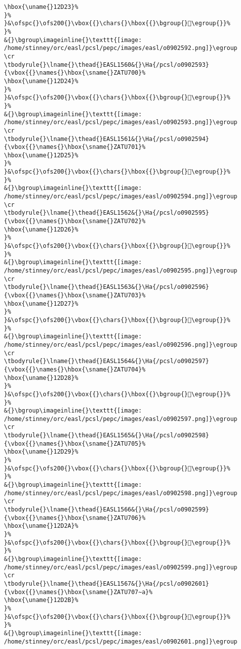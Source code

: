 \begin{verbatim}
\hbox{\uname{}12D23}%
}%
}&\ofspc{}\ofs200{}\vbox{{}\chars{}\hbox{{}\bgroup{}𒴣\egroup{}}%
}%
&{}\bgroup\imageinline{}\texttt{[image: /home/stinney/orc/easl/pcsl/pepc/images/easl/o0902592.png]}\egroup
\cr
\tbodyrule{}\lname{}\thead{}EASL1560&{}\Ha{/pcsl/o0902593}{\vbox{{}\names{}\hbox{\sname{}ZATU700}%
\hbox{\uname{}12D24}%
}%
}&\ofspc{}\ofs200{}\vbox{{}\chars{}\hbox{{}\bgroup{}𒴤\egroup{}}%
}%
&{}\bgroup\imageinline{}\texttt{[image: /home/stinney/orc/easl/pcsl/pepc/images/easl/o0902593.png]}\egroup
\cr
\tbodyrule{}\lname{}\thead{}EASL1561&{}\Ha{/pcsl/o0902594}{\vbox{{}\names{}\hbox{\sname{}ZATU701}%
\hbox{\uname{}12D25}%
}%
}&\ofspc{}\ofs200{}\vbox{{}\chars{}\hbox{{}\bgroup{}𒴥\egroup{}}%
}%
&{}\bgroup\imageinline{}\texttt{[image: /home/stinney/orc/easl/pcsl/pepc/images/easl/o0902594.png]}\egroup
\cr
\tbodyrule{}\lname{}\thead{}EASL1562&{}\Ha{/pcsl/o0902595}{\vbox{{}\names{}\hbox{\sname{}ZATU702}%
\hbox{\uname{}12D26}%
}%
}&\ofspc{}\ofs200{}\vbox{{}\chars{}\hbox{{}\bgroup{}𒴦\egroup{}}%
}%
&{}\bgroup\imageinline{}\texttt{[image: /home/stinney/orc/easl/pcsl/pepc/images/easl/o0902595.png]}\egroup
\cr
\tbodyrule{}\lname{}\thead{}EASL1563&{}\Ha{/pcsl/o0902596}{\vbox{{}\names{}\hbox{\sname{}ZATU703}%
\hbox{\uname{}12D27}%
}%
}&\ofspc{}\ofs200{}\vbox{{}\chars{}\hbox{{}\bgroup{}𒴧\egroup{}}%
}%
&{}\bgroup\imageinline{}\texttt{[image: /home/stinney/orc/easl/pcsl/pepc/images/easl/o0902596.png]}\egroup
\cr
\tbodyrule{}\lname{}\thead{}EASL1564&{}\Ha{/pcsl/o0902597}{\vbox{{}\names{}\hbox{\sname{}ZATU704}%
\hbox{\uname{}12D28}%
}%
}&\ofspc{}\ofs200{}\vbox{{}\chars{}\hbox{{}\bgroup{}𒴨\egroup{}}%
}%
&{}\bgroup\imageinline{}\texttt{[image: /home/stinney/orc/easl/pcsl/pepc/images/easl/o0902597.png]}\egroup
\cr
\tbodyrule{}\lname{}\thead{}EASL1565&{}\Ha{/pcsl/o0902598}{\vbox{{}\names{}\hbox{\sname{}ZATU705}%
\hbox{\uname{}12D29}%
}%
}&\ofspc{}\ofs200{}\vbox{{}\chars{}\hbox{{}\bgroup{}𒴩\egroup{}}%
}%
&{}\bgroup\imageinline{}\texttt{[image: /home/stinney/orc/easl/pcsl/pepc/images/easl/o0902598.png]}\egroup
\cr
\tbodyrule{}\lname{}\thead{}EASL1566&{}\Ha{/pcsl/o0902599}{\vbox{{}\names{}\hbox{\sname{}ZATU706}%
\hbox{\uname{}12D2A}%
}%
}&\ofspc{}\ofs200{}\vbox{{}\chars{}\hbox{{}\bgroup{}𒴪\egroup{}}%
}%
&{}\bgroup\imageinline{}\texttt{[image: /home/stinney/orc/easl/pcsl/pepc/images/easl/o0902599.png]}\egroup
\cr
\tbodyrule{}\lname{}\thead{}EASL1567&{}\Ha{/pcsl/o0902601}{\vbox{{}\names{}\hbox{\sname{}ZATU707∼a}%
\hbox{\uname{}12D2B}%
}%
}&\ofspc{}\ofs200{}\vbox{{}\chars{}\hbox{{}\bgroup{}𒴫\egroup{}}%
}%
&{}\bgroup\imageinline{}\texttt{[image: /home/stinney/orc/easl/pcsl/pepc/images/easl/o0902601.png]}\egroup

\end{verbatim}
